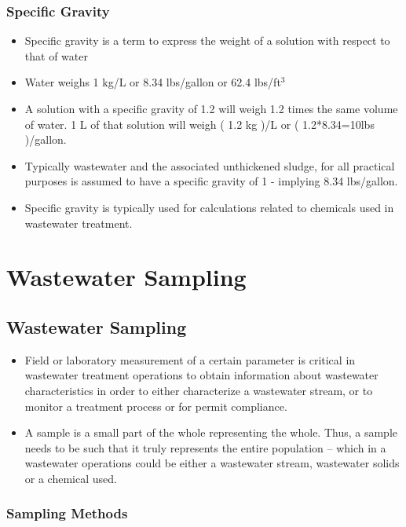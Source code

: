 \subsection{Specific Gravity}				
			\begin{itemize}
				\item Specific gravity is a term to express the weight of a solution with respect to that of water
				\item Water weighs 1 kg/L or 8.34 lbs/gallon or 62.4 lbs/ft$^3$
				\item A solution with a specific gravity of 1.2 will weigh 1.2 times the same volume of water.  1 L of that solution will weigh ( 1.2 kg )/L  or  ( 1.2*8.34=10lbs )/gallon.
				\item Typically wastewater and the associated unthickened sludge, for all practical purposes is assumed to have a specific gravity of 1 - implying 8.34 lbs/gallon.
				\item Specific gravity is typically used for calculations related to chemicals used in wastewater treatment.
			\end{itemize}
\chapter{Wastewater Sampling}		
\section{Wastewater Sampling}
		\begin{itemize}
			\item Field or laboratory measurement of a certain parameter is critical in wastewater treatment operations to obtain information about wastewater characteristics in order to either characterize a wastewater stream, or to monitor a treatment process or for permit compliance.  
			\item A sample is a small part of the whole representing the whole.  Thus, a sample needs to be such that it truly represents the entire population – which in a wastewater operations could be either a wastewater stream, wastewater solids or a chemical used.
		\end{itemize}
		
\subsection{Sampling Methods}
